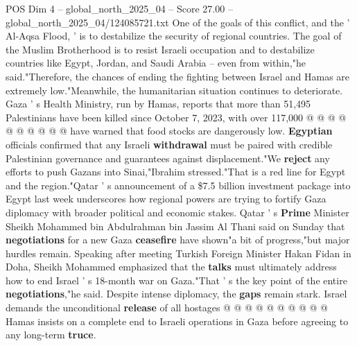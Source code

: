 \begin{textsample}{POS Dim 4 – global\_north\_2025\_04 – Score 27.00 – global\_north\_2025\_04/124085721.txt}
One of the goals of this conflict, and the ' Al-Aqsa Flood, ' is to destabilize the security of regional countries.
The goal of the Muslim Brotherhood is to resist Israeli occupation and to destabilize countries like Egypt, Jordan, and Saudi Arabia -- even from within,"he said."Therefore, the chances of ending the fighting between Israel and Hamas are extremely low."Meanwhile, the humanitarian situation continues to deteriorate.
Gaza ' s Health Ministry, run by Hamas, reports that more than 51,495 Palestinians have been killed since October 7, 2023, with over 117,000 @ @ @ @ @ @ @ @ @ @ have warned that food stocks are dangerously low. \textbf{Egyptian} officials confirmed that any Israeli \textbf{withdrawal} must be paired with credible Palestinian governance and guarantees against displacement."We \textbf{reject} any efforts to push Gazans into Sinai,"Ibrahim stressed."That is a red line for Egypt and the region."Qatar ' s announcement of a \$7.5 billion investment package into Egypt last week underscores how regional powers are trying to fortify Gaza diplomacy with broader political and economic stakes.
Qatar ' s \textbf{Prime} Minister Sheikh Mohammed bin Abdulrahman bin Jassim Al Thani said on Sunday that \textbf{negotiations} for a new Gaza \textbf{ceasefire} have shown"a bit of progress,"but major hurdles remain.
Speaking after meeting Turkish Foreign Minister Hakan Fidan in Doha, Sheikh Mohammed emphasized that the \textbf{talks} must ultimately address how to end Israel ' s 18-month war on Gaza."That ' s the key point of the entire \textbf{negotiations},"he said.
Despite intense diplomacy, the \textbf{gaps} remain stark.
Israel demands the unconditional \textbf{release} of all hostages @ @ @ @ @ @ @ @ @ @ Hamas insists on a complete end to Israeli operations in Gaza before agreeing to any long-term \textbf{truce}.

\end{textsample}
